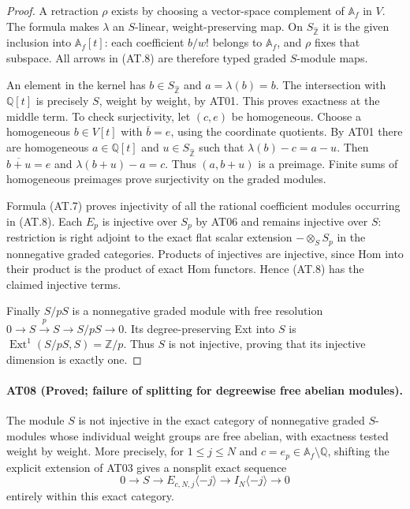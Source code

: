 \begin{proof}
A retraction $\rho$ exists by choosing a vector-space
complement of $\mathbb A_f$ in $V$. The formula makes
$\lambda$ an $S$-linear, weight-preserving map. On
$S_{\widehat{\mathbb Z}}$ it is the given inclusion into
$\mathbb A_f[t]$: each coefficient $b/w!$ belongs to
$\mathbb A_f$, and $\rho$ fixes that subspace.
All arrows in (AT.8) are therefore typed graded
$S$-module maps.

An element in the kernel has
$b\in S_{\widehat{\mathbb Z}}$ and $a=\lambda(b)=b$.
The intersection with $\mathbb Q[t]$ is precisely $S$,
weight by weight, by AT01. This proves exactness at
the middle term. To check surjectivity, let $(c,e)$
be homogeneous. Choose a homogeneous $b\in V[t]$
with $\overline b=e$, using the coordinate quotients.
By AT01 there are homogeneous
$a\in\mathbb Q[t]$ and $u\in S_{\widehat{\mathbb Z}}$
such that $\lambda(b)-c=a-u$. Then
$\overline{b+u}=e$ and
$\lambda(b+u)-a=c$. Thus $(a,b+u)$ is a preimage.
Finite sums of homogeneous preimages prove surjectivity
on the graded modules.

Formula (AT.7) proves injectivity of all the rational
coefficient modules occurring in (AT.8). Each $E_p$
is injective over $S_p$ by AT06 and remains injective
over $S$: restriction is right adjoint to the exact
flat scalar extension $-\otimes_S S_p$ in the
nonnegative graded categories. Products of injectives
are injective, since Hom into their product is the
product of exact Hom functors. Hence (AT.8) has the
claimed injective terms.

Finally $S/pS$ is a nonnegative graded module with
free resolution $0\to S\xrightarrow{p}S\to S/pS\to0$.
Its degree-preserving Ext into $S$ is
$\operatorname{Ext}^1(S/pS,S)=\mathbb Z/p$.
Thus $S$ is not injective, proving that its injective
dimension is exactly one.
\end{proof}

\paragraph{AT08 (Proved; failure of splitting for degreewise free abelian modules).}
The module $S$ is not injective in the exact category
of nonnegative graded $S$-modules whose individual
weight groups are free abelian, with exactness tested
weight by weight. More precisely, for
$1\leq j\leq N$ and $c=e_p\in\mathbb A_f\setminus\mathbb Q$,
shifting the explicit extension of AT03 gives a
nonsplit exact sequence
\[
 0\longrightarrow S\longrightarrow
 E_{c,N,j}\langle-j\rangle\longrightarrow
 I_N\langle-j\rangle\longrightarrow0
 \tag{AT.9}
\]
entirely within this exact category.

